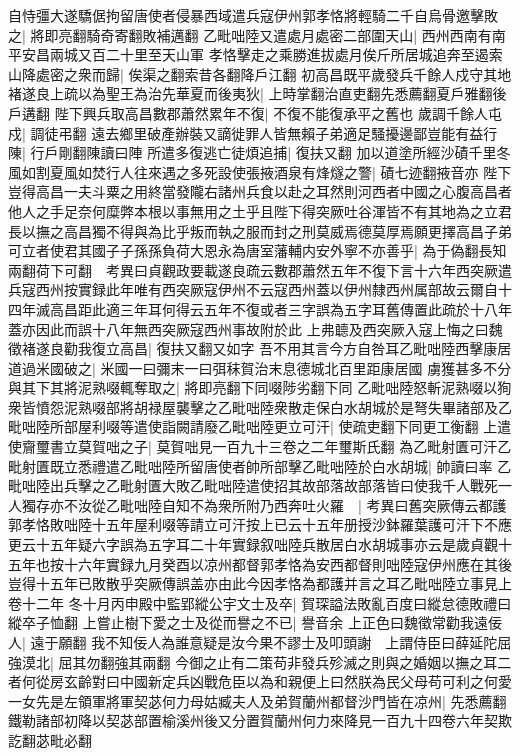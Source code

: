 自恃彊大遂驕倨拘留唐使者侵暴西域遣兵寇伊州郭孝恪將輕騎二千自烏骨邀擊敗之|{
	將即亮翻騎奇寄翻敗補邁翻}
乙毗咄陸又遣處月處密二部圍天山|{
	西州西南有南平安昌兩城又百二十里至天山軍}
孝恪擊走之乘勝進拔處月俟斤所居城追奔至遏索山降處密之衆而歸|{
	俟渠之翻索昔各翻降戶江翻}
初高昌既平歲發兵千餘人戍守其地褚遂良上疏以為聖王為治先華夏而後夷狄|{
	上時掌翻治直吏翻先悉薦翻夏戶雅翻後戶遘翻}
陛下興兵取高昌數郡蕭然累年不復|{
	不復不能復承平之舊也}
歲調千餘人屯戍|{
	調徒弔翻}
遠去鄉里破產辦裝又謫徙罪人皆無賴子弟適足騷擾邊鄙豈能有益行陳|{
	行戶剛翻陳讀曰陣}
所遣多復逃亡徒煩追捕|{
	復扶又翻}
加以道塗所經沙磧千里冬風如割夏風如焚行人往來遇之多死設使張掖酒泉有烽燧之警|{
	磧七迹翻掖音亦}
陛下豈得高昌一夫斗粟之用終當發隴右諸州兵食以赴之耳然則河西者中國之心腹高昌者他人之手足奈何糜弊本根以事無用之土乎且陛下得突厥吐谷渾皆不有其地為之立君長以撫之高昌獨不得與為比乎叛而執之服而封之刑莫威焉德莫厚焉願更擇高昌子弟可立者使君其國子子孫孫負荷大恩永為唐室藩輔内安外寧不亦善乎|{
	為于偽翻長知兩翻荷下可翻　考異曰貞觀政要載遂良疏云數郡蕭然五年不復下言十六年西突厥遣兵寇西州按實録此年唯有西突厥寇伊州不云寇西州蓋以伊州隸西州属部故云爾自十四年滅高昌距此適三年耳何得云五年不復或者三字誤為五字耳舊傳置此疏於十八年蓋亦因此而誤十八年無西突厥寇西州事故附於此}
上弗聼及西突厥入寇上悔之曰魏徵褚遂良勸我復立高昌|{
	復扶又翻又如字}
吾不用其言今方自咎耳乙毗咄陸西擊康居道過米國破之|{
	米國一曰彌末一曰弭秣賀治末息德城北百里距康居國}
虜獲甚多不分與其下其將泥熟啜輒奪取之|{
	將即亮翻下同啜陟劣翻下同}
乙毗咄陸怒斬泥熟啜以狥衆皆憤怨泥熟啜部將胡禄屋襲擊之乙毗咄陸衆散走保白水胡城於是弩失畢諸部及乙毗咄陸所部屋利啜等遣使詣闕請廢乙毗咄陸更立可汗|{
	使疏吏翻下同更工衡翻}
上遣使齎璽書立莫賀咄之子|{
	莫賀咄見一百九十三卷之二年璽斯氏翻}
為乙毗射匱可汗乙毗射匱既立悉禮遣乙毗咄陸所留唐使者帥所部擊乙毗咄陸於白水胡城|{
	帥讀曰率}
乙毗咄陸出兵擊之乙毗射匱大敗乙毗咄陸遣使招其故部落故部落皆曰使我千人戰死一人獨存亦不汝從乙毗咄陸自知不為衆所附乃西奔吐火羅　|{
	考異曰舊突厥傳云都護郭孝恪敗咄陸十五年屋利啜等請立可汗按上已云十五年册授沙鉢羅葉護可汗下不應更云十五年疑六字誤為五字耳二十年實録叙咄陸兵散居白水胡城事亦云是歲貞觀十五年也按十六年實録九月癸酉以凉州都督郭孝恪為安西都督則咄陸寇伊州應在其後豈得十五年已敗散乎突厥傳誤盖亦由此今因孝恪為都護并言之耳乙毗咄陸立事見上卷十二年}
冬十月丙申殿中監郢縱公宇文士及卒|{
	賀琛謚法敗亂百度曰縱怠德敗禮曰縱卒子恤翻}
上嘗止樹下愛之士及從而譽之不已|{
	譽音余}
上正色曰魏徵常勸我遠佞人|{
	遠于願翻}
我不知佞人為誰意疑是汝今果不謬士及叩頭謝　上謂侍臣曰薛延陀屈強漠北|{
	屈其勿翻強其兩翻}
今御之止有二策苟非發兵殄滅之則與之婚姻以撫之耳二者何從房玄齡對曰中國新定兵凶戰危臣以為和親便上曰然朕為民父母苟可利之何愛一女先是左領軍將軍契苾何力母姑臧夫人及弟賀蘭州都督沙門皆在凉州|{
	先悉薦翻鐵勒諸部初降以契苾部置榆溪州後又分置賀蘭州何力來降見一百九十四卷六年契欺訖翻苾毗必翻}
